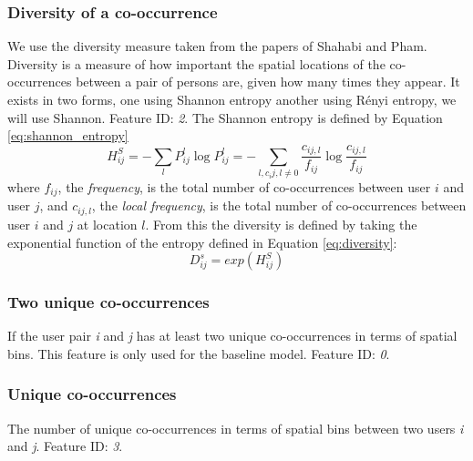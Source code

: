 \subsubsection{Diversity of a co-occurrence}
We use the diversity measure taken from the papers of Shahabi and Pham\cite{iRWRfSD}\cite{AEBMtISSfSD}.
Diversity is a measure of how important the spatial locations of the co-occurrences between a pair of persons are, given how many times they appear.
It exists in two forms, one using Shannon entropy another using Rényi entropy, we will use Shannon. Feature ID: \textit{2}.
The Shannon entropy is defined by Equation \ref{eq:shannon_entropy}
\begin{equation}
\label{eq:shannon_entropy}
H^S_{ij}=-\sum\limits_{l}P^l_{ij} \log P^l_{ij}= -\sum\limits_{l,c_ij,l\neq 0}\frac{c_{ij,l}}{f_{ij}}\log \frac{c_{ij,l}}{f_{ij}}
\end{equation}
where $f_{ij}$, the \textit{frequency}, is the total number of co-occurrences between user $i$ and user $j$, and $c_{ij,l}$, the \textit{local frequency}, is the total number of co-occurrences between user $i$ and $j$ at location $l$.
From this the diversity is defined by taking the exponential function of the entropy defined in Equation \ref{eq:diversity}:
\begin{equation}
\label{eq:diversity}
D^s_{ij} = exp(H^S_{ij})
\end{equation}

\subsubsection{Two unique co-occurrences}
If the user pair \textit{i} and \textit{j} has at least two unique co-occurrences in terms of spatial bins. This feature is only used for the baseline model. Feature ID: \textit{0}.

\subsubsection{Unique co-occurrences}
The number of unique co-occurrences in terms of spatial bins between two users \textit{i} and \textit{j}. Feature ID: \textit{3}.

